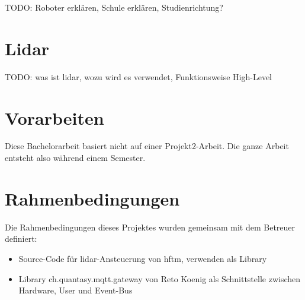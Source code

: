 TODO:
Roboter erklären, Schule erklären, Studienrichtung?

\section{Lidar}
TODO:
was ist \acrshort{lidar}, wozu wird es verwendet, Funktionsweise High-Level



\section{Vorarbeiten}
Diese Bachelorarbeit basiert nicht auf einer Projekt2-Arbeit. Die ganze Arbeit entsteht also während einem Semester.

\section{Rahmenbedingungen}
Die Rahmenbedingungen dieses Projektes wurden gemeinsam mit dem Betreuer definiert:
\begin{itemize}
\item Source-Code für \acrshort{lidar}-Ansteuerung von \acrshort{hftm}, verwenden als Library
\item Library ch.quantasy.mqtt.gateway\cite{ch.quantasy.mqtt.gateway} von Reto Koenig als Schnittstelle zwischen Hardware, User und Event-Bus
\end{itemize}

